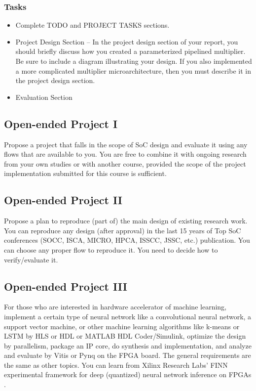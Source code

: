 \documentclass[a4paper,12pt,twoside]{article}
\begin{document}
\subsubsection{Tasks}
\begin{itemize}
    \item Complete TODO and PROJECT TASKS sections.
    \item Project Design Section – In the project design section of your report, you should briefly discuss how you created a parameterized pipelined multiplier. Be sure to include a diagram illustrating your design. If you also implemented a more complicated multiplier microarchitecture, then you must describe it in the project design section.
    \item Evaluation Section
\end{itemize}

\subsection{Open-ended Project I}
Propose a project that falls in the scope of SoC design and evaluate it using any flows that are available to you. You are free to combine it with ongoing research from your own studies or with another course, provided the scope of the project implementation submitted for this course is sufficient. 

\subsection{Open-ended Project II}
Propose a plan to reproduce (part of) the main design of existing research work. You can reproduce any design (after approval) in the last 15 years of Top SoC conferences (SOCC, ISCA, MICRO, HPCA, ISSCC, JSSC, etc.) publication. You can choose any proper flow to reproduce it. You need to decide how to verify/evaluate it.

\subsection{Open-ended Project III}
For those who are interested in hardware accelerator of machine learning, implement a certain type of neural network like a convolutional neural network, a support vector machine, or other machine learning algorithms like k-means or LSTM by HLS or HDL or MATLAB HDL Coder/Simulink, optimize the design by parallelism, package an IP core, do synthesis and implementation, and analyze and evaluate by Vitis or Pynq on the FPGA board. The general requirements are the same as other topics. You can learn from Xilinx Research Labs' FINN experimental framework for deep (quantized) neural network inference on FPGAs \cite{finn}.
\end{document}
